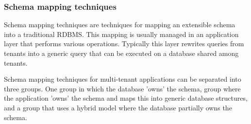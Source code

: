 \subsubsection{Schema mapping techniques}
Schema mapping techniques are techniques for mapping an extensible schema into a traditional \ac{RDBMS}.
This mapping is usually managed in an application layer that performs various operations. 
Typically this layer rewrites queries from tenants into a generic query that can be executed on a database shared among tenants.

Schema mapping techniques for multi-tenant applications can be separated into three groups. 
One group in which the database 'owns' the schema, group where the application 'owns' the schema and maps this into generic database structures, and a group that uses a hybrid model where the database partially owns the schema.~\cite{aulbach2009comparison}

